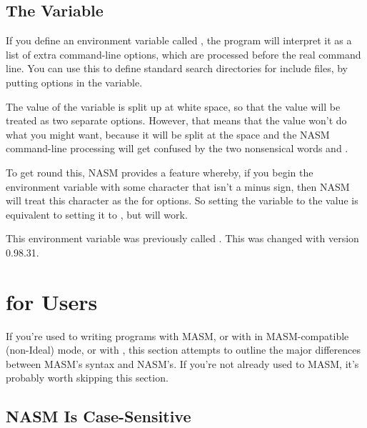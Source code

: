 \subsection{The   Variable}
\label{subsec:nasmenv}

If you define an environment variable called , the program
will interpret it as a list of extra command-line options, which are
processed before the real command line. You can use this to define
standard search directories for include files, by putting 
options in the  variable.

The value of the variable is split up at white space, so that the
value  will be
treated as two separate options. However, that means that the value
 won't do what you might want, because it
will be split at the space and the NASM command-line processing
will get confused by the two nonsensical words 
and .

To get round this, NASM provides a feature whereby, if you begin the
 environment variable with some character that isn't
a minus sign, then NASM will treat this character as the
 for options. So setting the 
variable to the value 
is equivalent to setting it to ,
but  will work.

This environment variable was previously called . This was
changed with version 0.98.31.

\section{ for  Users}
\label{subsec:qstart}

If you're used to writing programs with MASM, or with  in
MASM-compatible (non-Ideal) mode, or with , this section
attempts to outline the major differences between MASM's syntax and
NASM's. If you're not already used to MASM, it's probably worth
skipping this section.

\subsection{NASM Is Case-Sensitive}
\label{subsec:qscs}

